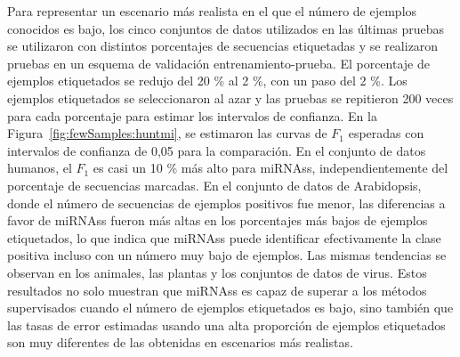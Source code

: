 Para representar un escenario más realista en el que el número de ejemplos conocidos es bajo, los cinco conjuntos de datos utilizados en las últimas pruebas
se utilizaron con distintos porcentajes de secuencias etiquetadas y se realizaron pruebas en un esquema de validación entrenamiento-prueba. El porcentaje de
ejemplos etiquetados se redujo del 20 \% al 2 \%, con un paso del 2 \%. Los ejemplos etiquetados se seleccionaron al azar y las pruebas se repitieron 200 veces
para cada porcentaje para estimar los intervalos de confianza. En la Figura~\ref{fig:fewSamples:huntmi}, se estimaron las curvas de $F_{1}$ esperadas con
intervalos de confianza de 0,05 para la comparación. En el conjunto de datos humanos, el $F_{1}$ es casi un 10 \% más alto para miRNAss, independientemente
del porcentaje de secuencias marcadas. En el conjunto de datos de Arabidopsis, donde el número de secuencias de ejemplos positivos fue menor, las diferencias
a favor de miRNAss fueron más altas en los porcentajes más bajos de ejemplos etiquetados, lo que indica que miRNAss puede identificar efectivamente la clase
positiva incluso con un número muy bajo de ejemplos. Las mismas tendencias se observan en los animales, las plantas y los conjuntos de datos de virus.
Estos resultados no solo muestran que miRNAss es capaz de superar a los métodos supervisados cuando el número de ejemplos etiquetados es bajo, sino
también que las tasas de error estimadas usando una alta proporción de ejemplos etiquetados son muy diferentes de las obtenidas en escenarios más realistas.

